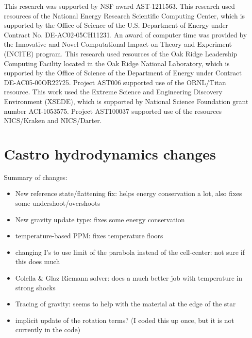 \documentclass[12pt,preprint]{aastex}
\begin{document}
\acknowledgments

This research was supported by NSF award AST-1211563.  This research
used resources of the National Energy Research Scientific Computing
Center, which is supported by the Office of Science of the
U.S. Department of Energy under Contract No. DE-AC02-05CH11231.  An
award of computer time was provided by the Innovative and Novel
Computational Impact on Theory and Experiment (INCITE) program.  This
research used resources of the Oak Ridge Leadership Computing Facility
located in the Oak Ridge National Laboratory, which is supported by
the Office of Science of the Department of Energy under Contract
DE-AC05-00OR22725. Project AST006 supported use of the ORNL/Titan resource. This work used the Extreme Science and Engineering Discovery Environment (XSEDE), which is supported by National Science Foundation grant number ACI-1053575. Project AST100037 supported use of the resources NICS/Kraken and NICS/Darter.


\clearpage





\clearpage
\appendix

\section{Castro hydrodynamics changes}

Summary of changes:
\begin{itemize}
\item New reference state/flattening fix: helps energy conservation a
  lot, also fixes some undershoot/overshoots

\item New gravity update type: fixes some energy conservation

\item temperature-based PPM: fixes temperature floors

\item changing I's to use limit of the parabola instead of the
  cell-center: not sure if this does much

\item Colella \& Glaz Riemann solver: does a much better job with
  temperature in strong shocks

\item Tracing of gravity: seems to help with the material at the edge
  of the star

\item implicit update of the rotation terms?  (I coded this up once, but
  it is not currently in the code)
\end{itemize}
\end{document}
